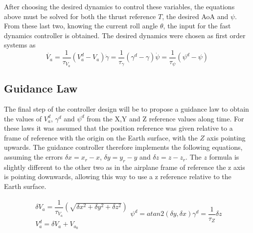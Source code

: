 After choosing the desired dynamics to control these variables, the equations above must be solved for both the thrust reference $T$, the desired AoA and $\psi$. From these last two, knowing the current roll angle $\theta$, the input for the fast dynamics controller is obtained. The desired dynamics were chosen as first order systems as
\begin{subequations}
\begin{equation}
\dot{V_a} = \dfrac{1}{\tau_{V_a}}(V_a^d-V_a)
\label{eq:va_dot_des}
\end{equation}
\begin{equation}
\dot{\gamma} = \dfrac{1}{\tau_{\gamma}}(\gamma^d-\gamma)
\label{eq:gamma_dot_des}
\end{equation}
\begin{equation}
\dot{\psi} = \dfrac{1}{\tau_{\psi}}(\psi^d-\psi)
\label{eq:psi_dot_des}
\end{equation}
\end{subequations}

\subsection{Guidance Law}

The final step of the controller design will be to propose a guidance law to obtain the values of $V_a^d$, $\gamma^d$ and $\psi^d$ from the X,Y and Z reference values along time. For these laws it was assumed that the position reference was given relative to a frame of reference with the origin on the Earth surface, with the $Z$ axis pointing upwards. The guidance controller therefore implements the following equations, assuming the errors $\delta x = x_r - x$, $\delta y = y_r - y$ and $\delta z = z - z_r$. The $z$ formula is slightly different to the other two as in the airplane frame of reference the z axis is pointing downwards, allowing this way to use a z reference relative to the Earth surface.

\begin{subequations}
	\begin{gather}
	\delta V_a = \dfrac{1}{\tau_{V_a}}(\sqrt{\delta x^2 + \delta y^2 + \delta z^2})\\
	V_a^d= \delta V_a  + V_{a_0}
	\end{gather}
	\begin{equation}
	\psi^d = atan2(\delta y,\delta x)
	\end{equation}
	\begin{equation}
	\gamma^d = \dfrac{1}{\tau_Z}\delta z
	\end{equation}
	\label{eq:guidance_law}
\end{subequations}

